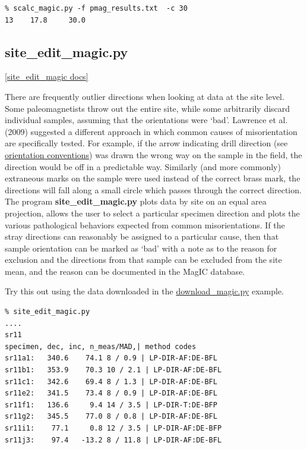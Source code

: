 \documentclass[11pt]{book}
\begin{document}
{\begin{verbatim}
% scalc_magic.py -f pmag_results.txt  -c 30
13    17.8     30.0

\end{verbatim}


\subsection{site\_edit\_magic.py}
\href{https://github.com/PmagPy/PmagPy/blob/master/programs/site_edit_magic.py}{[site\_edit\_magic docs]}

There are frequently outlier directions when looking at data at the site level.  Some paleomagnetists throw out the entire site, while some arbitrarily discard individual samples, assuming that the orientations were `bad'.  Lawrence et al. (2009) \nocite{lawrence09} suggested a different approach in which common causes of misorientation are specifically tested.  For example, if the arrow indicating drill direction (see \href{#orientiation\_magic.py}{orientation conventions}) was drawn the wrong way on the sample in the field, the direction would be off in a predictable way.  Similarly (and more commonly) extraneous marks on the sample were used instead of the correct brass mark, the directions will fall along a small circle which passes through the correct direction.  The program {\bf site\_edit\_magic.py} plots data by site on an equal area projection, allows the user to select a particular specimen direction and plots the various pathological behaviors expected from common misorientations.  If the stray directions can reasonably be assigned to a particular cause, then that sample orientation can be marked as `bad' with a note as to the reason for exclusion and the directions from that sample can be excluded from the site mean, and the reason can be documented in the MagIC database.

Try this out using the data downloaded  in the \href{#download_magic.py}{download\_magic.py} example.

\begin{verbatim}
% site_edit_magic.py
....
sr11
specimen, dec, inc, n_meas/MAD,| method codes
sr11a1:   340.6    74.1 8 / 0.9 | LP-DIR-AF:DE-BFL
sr11b1:   353.9    70.3 10 / 2.1 | LP-DIR-AF:DE-BFL
sr11c1:   342.6    69.4 8 / 1.3 | LP-DIR-AF:DE-BFL
sr11e2:   341.5    73.4 8 / 0.9 | LP-DIR-AF:DE-BFL
sr11f1:   136.6     9.4 14 / 3.5 | LP-DIR-T:DE-BFP
sr11g2:   345.5    77.0 8 / 0.8 | LP-DIR-AF:DE-BFL
sr11i1:    77.1     0.8 12 / 3.5 | LP-DIR-AF:DE-BFP
sr11j3:    97.4   -13.2 8 / 11.8 | LP-DIR-AF:DE-BFL


\end{verbatim}}
\end{document}
